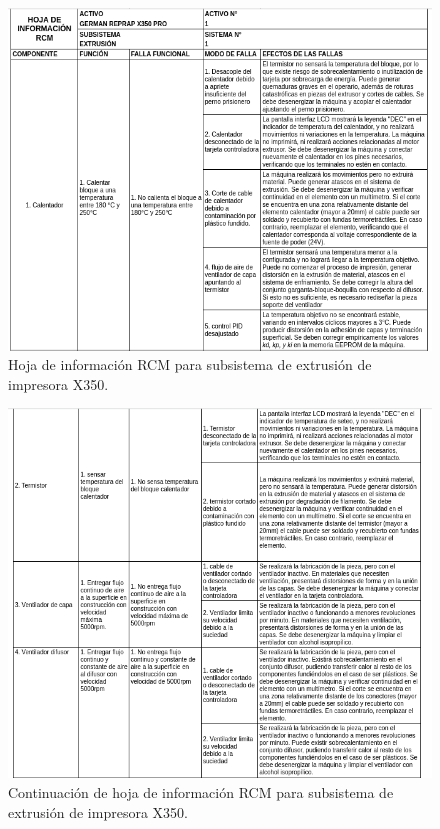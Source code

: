 \begin{figure}[H]
\centering
\includegraphics[scale=0.8]{images/amef1.png}
\caption{Hoja de información RCM para subsistema de extrusión de impresora X350.}
\end{figure}
\begin{figure}[H]
\centering
\includegraphics[scale=0.8]{images/amef2.png}
\caption{Continuación de hoja de información RCM para subsistema de extrusión de impresora X350.}
\end{figure}

